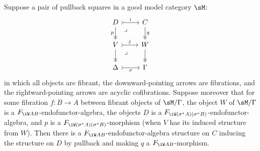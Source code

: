 \documentclass{amsart}
\let\W\iW
\begin{document}
\begin{lem}
  Suppose a pair of pullback squares in a good model category $\sM$:
  \[
  \begin{tikzcd}
    D \ar[r,>->,"i"] \ar[d,->>,"p",swap] \ar[dr,phantom,near start,"\lrcorner"] & C \ar[d,->>,"q"] \\
    V \ar[r,>->,"j"] \ar[d,->>] \ar[dr,phantom,near start,"\lrcorner"] & W \ar[d,->>] \\
    \Delta \ar[r,>->,"\sigma",swap] & \Gamma
  \end{tikzcd}
  \]
  in which all objects are fibrant, the downward-pointing arrows are fibrations, and the rightward-pointing arrows are acyclic cofibrations.
  Suppose moreover that for some fibration $f:B\to A$ between fibrant objects of $\sM/\Gamma$, the object $W$ of $\sM/\Gamma$ is a $F_{\W A B}$-endofunctor-algebra, the objects $D$ is a $F_{\W (\sigma^*A) (\sigma^*B)}$-endofunctor-algebra, and $p$ is a $F_{\W (\sigma^*A) (\sigma^*B)}$-morphism (when $V$ has its induced structure from $W$).
  Then there is a $F_{\W A B}$-endofunctor-algebra structure on $C$ inducing the structure on $D$ by pullback and making $q$ a $F_{\W A B}$-morphism.
\end{lem}
\end{document}
